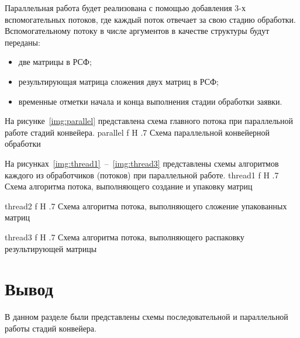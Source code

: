 Параллельная работа будет реализована с помощью добавления 3-х вспомогательных потоков, где каждый поток отвечает за свою стадию обработки.
Вспомогательному потоку в числе аргументов в качестве структуры будут переданы:
\begin{itemize}
	\item две матрицы в РСФ;
	\item результирующая матрица сложения двух матриц в РСФ;
	\item временные отметки начала и конца выполнения стадии обработки заявки.
\end{itemize}

\newpage

На рисунке~\ref{img:parallel} представлена схема главного потока при параллельной работе стадий конвейера.
{parallel}
{f}
{H}
{.7\textwidth}
{Схема параллельной конвейерной обработки}

\newpage

На рисунках~\ref{img:thread1}~--~\ref{img:thread3} представлены схемы алгоритмов каждого из обработчиков (потоков) при параллельной работе.
{thread1}
{f}
{H}
{.7\textwidth}
{Схема алгоритма потока, выполняющего создание и упаковку матриц}

{thread2}
{f}
{H}
{.7\textwidth}
{Схема алгоритма потока, выполняющего сложение упакованных матриц}

{thread3}
{f}
{H}
{.7\textwidth}
{Схема алгоритма потока, выполняющего распаковку результирующей матрицы}

\section*{Вывод}
В данном разделе были представлены схемы последовательной и параллельной работы стадий конвейера.